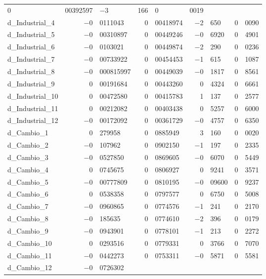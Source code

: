 \documentclass[11pt]{article}
\begin{document}
\begin{center}
\begin{tabular}{lr@{,}lr@{,}lr@{,}lr@{,}l}
    0&00392597 &
      $-$3&166 &
        0&0019 \\
d\_Industrial\_4 &
  $-$0&0111043 &
    0&00418974 &
      $-$2&650 &
        0&0090 \\
d\_Industrial\_5 &
  $-$0&00310897 &
    0&00449246 &
      $-$0&6920 &
        0&4901 \\
d\_Industrial\_6 &
  $-$0&0103021 &
    0&00449874 &
      $-$2&290 &
        0&0236 \\
d\_Industrial\_7 &
  $-$0&00733922 &
    0&00454453 &
      $-$1&615 &
        0&1087 \\
d\_Industrial\_8 &
  $-$0&000815997 &
    0&00449039 &
      $-$0&1817 &
        0&8561 \\
d\_Industrial\_9 &
  0&00191684 &
    0&00443260 &
      0&4324 &
        0&6661 \\
d\_Industrial\_10 &
  0&00472580 &
    0&00415783 &
      1&137 &
        0&2577 \\
d\_Industrial\_11 &
  0&00212082 &
    0&00403438 &
      0&5257 &
        0&6000 \\
d\_Industrial\_12 &
  $-$0&00172092 &
    0&00361729 &
      $-$0&4757 &
        0&6350 \\
d\_Cambio\_1 &
  0&279958 &
    0&0885949 &
      3&160 &
        0&0020 \\
d\_Cambio\_2 &
  $-$0&107962 &
    0&0902150 &
      $-$1&197 &
        0&2335 \\
d\_Cambio\_3 &
  $-$0&0527850 &
    0&0869605 &
      $-$0&6070 &
        0&5449 \\
d\_Cambio\_4 &
  0&0745675 &
    0&0806927 &
      0&9241 &
        0&3571 \\
d\_Cambio\_5 &
  $-$0&00777809 &
    0&0810195 &
      $-$0&09600 &
        0&9237 \\
d\_Cambio\_6 &
  0&0538358 &
    0&0797577 &
      0&6750 &
        0&5008 \\
d\_Cambio\_7 &
  $-$0&0960865 &
    0&0774576 &
      $-$1&241 &
        0&2170 \\
d\_Cambio\_8 &
  $-$0&185635 &
    0&0774610 &
      $-$2&396 &
        0&0179 \\
d\_Cambio\_9 &
  $-$0&0943901 &
    0&0778101 &
      $-$1&213 &
        0&2272 \\
d\_Cambio\_10 &
  0&0293516 &
    0&0779331 &
      0&3766 &
        0&7070 \\
d\_Cambio\_11 &
  $-$0&0442273 &
    0&0753311 &
      $-$0&5871 &
        0&5581 \\
d\_Cambio\_12 &
  $-$0&0726302 &

\end{tabular}
\end{center}
\end{document}
